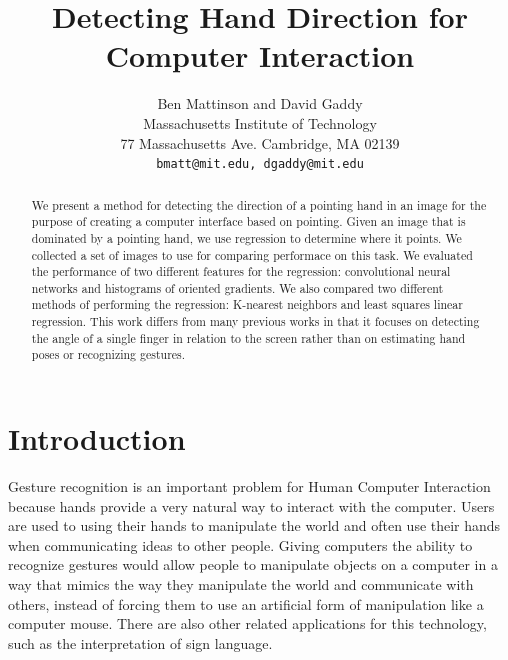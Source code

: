 \documentclass[10pt,twocolumn,letterpaper]{article}
\begin{document}
\title{Detecting Hand Direction for Computer Interaction}

\author{Ben Mattinson and David Gaddy\\
Massachusetts Institute of Technology\\
77 Massachusetts Ave. Cambridge, MA 02139\\
{\tt\small bmatt@mit.edu, dgaddy@mit.edu}
}

\maketitle

\begin{abstract}
We present a method for detecting the direction of a pointing hand in an image for the purpose of creating a computer interface based on pointing.  Given an image that is dominated by a pointing hand, we use regression to determine where it points.  We collected a set of images to use for comparing performace on this task.  We evaluated the performance of two different features for the regression: convolutional neural networks and histograms of oriented gradients.  We also compared two different methods of performing the regression: K-nearest neighbors and least squares linear regression.  This work differs from many previous works in that it focuses on detecting the angle of a single finger in relation to the screen rather than on estimating hand poses or recognizing gestures.

\end{abstract}

\section{Introduction}

Gesture recognition is an important problem for Human Computer Interaction because hands provide a very natural way to interact with the computer. Users are used to using their hands to manipulate the world and often use their hands when communicating ideas to other people. Giving computers the ability to recognize gestures would allow people to manipulate objects on a computer in a way that mimics the way they manipulate the world and communicate with others, instead of forcing them to use an artificial form of manipulation like a computer mouse. There are also other related applications for this technology, such as the interpretation of sign language.
\end{document}
